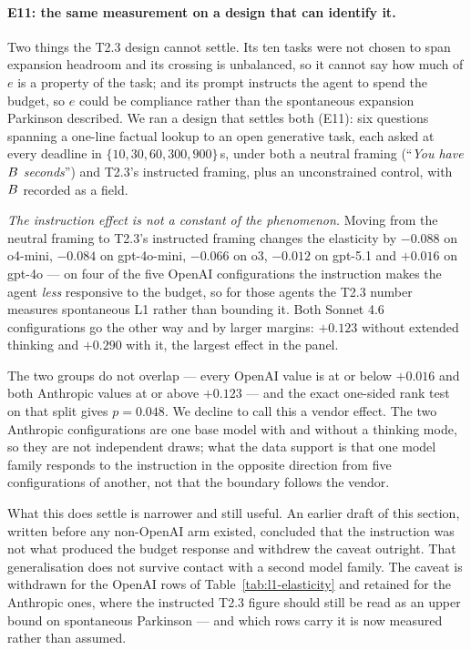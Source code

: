 \paragraph{E11: the same measurement on a design that can identify it.}
Two things the T2.3 design cannot settle. Its ten tasks were not chosen to
span expansion headroom and its crossing is unbalanced, so it cannot say how
much of $e$ is a property of the task; and its prompt instructs the agent to
spend the budget, so $e$ could be compliance rather than the spontaneous
expansion Parkinson described. We ran a design that settles both (E11): six questions spanning a one-line factual lookup to
an open generative task, each asked at every deadline in
$\{10, 30, 60, 300, 900\}$\,s, under both a neutral framing
(``\textit{You have $B$ seconds}'') and T2.3's instructed framing, plus
an unconstrained control, with $B$ recorded as a field.

\emph{The instruction effect is not a constant of the phenomenon.} Moving from
the neutral framing to T2.3's instructed framing changes the elasticity by
$-0.088$ on o4-mini, $-0.084$ on gpt-4o-mini, $-0.066$ on o3, $-0.012$ on
gpt-5.1 and $+0.016$ on gpt-4o --- on four of the five OpenAI configurations
the instruction makes the agent \emph{less} responsive to the budget, so for
those agents the T2.3 number measures spontaneous L1 rather than bounding it.
Both Sonnet 4.6 configurations go the other way and by larger margins:
$+0.123$ without extended thinking and $+0.290$ with it, the largest effect in
the panel.

The two groups do not overlap --- every OpenAI value is at or below $+0.016$
and both Anthropic values at or above $+0.123$ --- and the exact one-sided
rank test on that split gives $p = 0.048$. We decline to call this a vendor
effect. The two Anthropic configurations are one base model with and without a
thinking mode, so they are not independent draws; what the data support is that
one model family responds to the instruction in the opposite direction from
five configurations of another, not that the boundary follows the vendor.

What this does settle is narrower and still useful. An earlier draft of this
section, written before any non-OpenAI arm existed, concluded that the
instruction was not what produced the budget response and withdrew the caveat
outright. That generalisation does not survive contact with a second model
family. The caveat is withdrawn for the OpenAI rows of
Table~\ref{tab:l1-elasticity} and retained for the Anthropic ones, where the
instructed T2.3 figure should still be read as an upper bound on spontaneous
Parkinson --- and which rows carry it is now measured rather than assumed.

